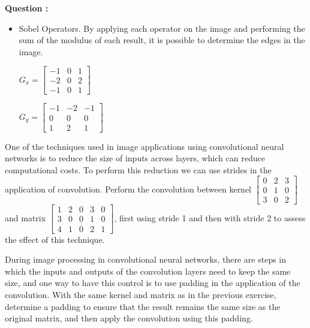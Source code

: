 \begin{list}{
\textbf{Question :}~}{}
\begin{itemize}
$G_x= \left[\begin{smallmatrix}
-1 & 0 & 1\\
-1 & 0 & 1\\
-1 & 0 & 1
\end{smallmatrix}\right]$

$G_y = \left[\begin{smallmatrix}
-1 & -1 & -1\\
 0 &  0 &  0\\
 1 &  1 &  1
\end{smallmatrix}\right]$

\item Sobel Operators. By applying each operator on the image and performing the sum of the modulus of each result, it is possible to determine the edges in the image.

$G_x= \left[\begin{smallmatrix}
-1 & 0 & 1\\
-2 & 0 & 2\\
-1 & 0 & 1
\end{smallmatrix}\right]$

$G_y = \left[\begin{smallmatrix}
-1 & -2 & -1\\
 0 &  0 &  0\\
 1 &  2 &  1
\end{smallmatrix}\right]$

\end{itemize}

\item \noindent One of the techniques used in image applications using convolutional neural networks is to reduce the size of inputs across layers, which can reduce computational costs. To perform this reduction we can use strides in the application of convolution. Perform the convolution between kernel $\left[\begin{smallmatrix}
0 & 2 & 3 \\
0 & 1 & 0 \\
3 & 0 & 2 
\end{smallmatrix}\right]$ and matrix  $\left[\begin{smallmatrix}
1 & 2 & 0 & 3 & 0\\
3 & 0 & 0 & 1 & 0\\
4 & 1 & 0 & 2 & 1
\end{smallmatrix}\right]$, first using stride 1 and then with stride 2 to assess the effect of this technique. 


\item \noindent During image processing in convolutional neural networks, there are steps in which the inputs and outputs of the convolution layers need to keep the same size, and one way to have this control is to use padding in the application of the convolution. With the same kernel and matrix as in the previous exercise, determine a padding to ensure that the result remains the same size as the original matrix, and then apply the convolution using this padding.



\end{list}
